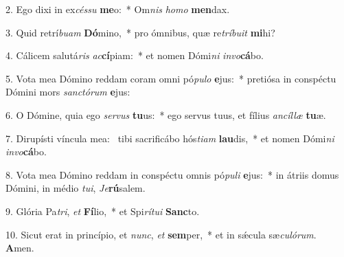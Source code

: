 2. Ego dixi in ex\textit{cés}\textit{su} \textbf{me}o:~*  Om\textit{nis} \textit{ho}\textit{mo} \textbf{men}dax.\

3. Quid retrí\textit{bu}\textit{am} \textbf{Dó}mino,~*  pro ómnibus, quæ re\textit{trí}\textit{bu}\textit{it} \textbf{mi}hi?\

4. Cálicem salutá\textit{ris} \textit{ac}\textbf{cí}piam:~*  et nomen Dómi\textit{ni} \textit{in}\textit{vo}\textbf{cá}bo.\

5. Vota mea Dómino reddam coram omni pó\textit{pu}\textit{lo} \textbf{e}jus:~*  pretiósa in conspéctu Dómini mors \textit{sanc}\textit{tó}\textit{rum} \textbf{e}jus:\

6. O Dómine, quia ego \textit{ser}\textit{vus} \textbf{tu}us:~*  ego servus tuus, et fílius \textit{an}\textit{cíl}\textit{læ} \textbf{tu}æ.\

7. Dirupísti víncula mea: \dag\  tibi sacrificábo hós\textit{ti}\textit{am} \textbf{lau}dis,~*  et nomen Dómi\textit{ni} \textit{in}\textit{vo}\textbf{cá}bo.\

8. Vota mea Dómino reddam in conspéctu omnis pó\textit{pu}\textit{li} \textbf{e}jus:~*  in átriis domus Dómini, in médio \textit{tu}\textit{i}, \textit{Je}\textbf{rú}salem.\

9. Glória Pa\textit{tri}, \textit{et} \textbf{Fí}lio,~*  et Spi\textit{rí}\textit{tu}\textit{i} \textbf{Sanc}to.\

10. Sicut erat in princípio, et \textit{nunc}, \textit{et} \textbf{sem}per,~*  et in sǽcula sæ\textit{cu}\textit{ló}\textit{rum}. \textbf{A}men.\

